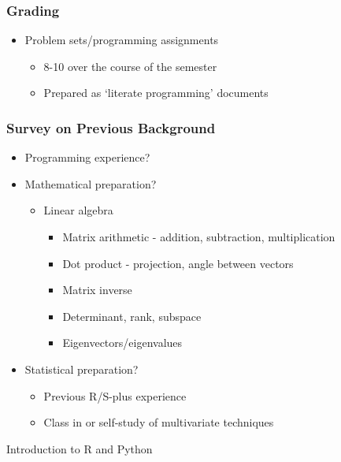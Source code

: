 \documentclass{beamer}
\begin{document}
\begin{frame}
  \frametitle{Grading}
\begin{itemize}
\item Problem sets/programming assignments
\begin{itemize}
	\item 8-10 over the course of the semester
	\item Prepared as `literate programming' documents
\end{itemize}

\end{itemize}

\end{frame}

\begin{frame}
  \frametitle{Survey on Previous Background}
\begin{itemize}

\item Programming experience?
\item Mathematical preparation?
\begin{itemize}
	\item Linear algebra
\begin{itemize}
	\item Matrix arithmetic - addition, subtraction, multiplication
	\item Dot product - projection, angle between vectors
	\item Matrix inverse
	\item Determinant, rank, subspace
	\item Eigenvectors/eigenvalues
\end{itemize}
\end{itemize}
\item Statistical preparation?
\begin{itemize}
	\item Previous R/S-plus experience
	\item Class in or self-study of multivariate techniques
\end{itemize}

\end{itemize}

\end{frame}

\begin{frame}
  
\begin{center}
\LARGE{Introduction to R and Python}
\end{center}

\end{frame}
\end{document}
